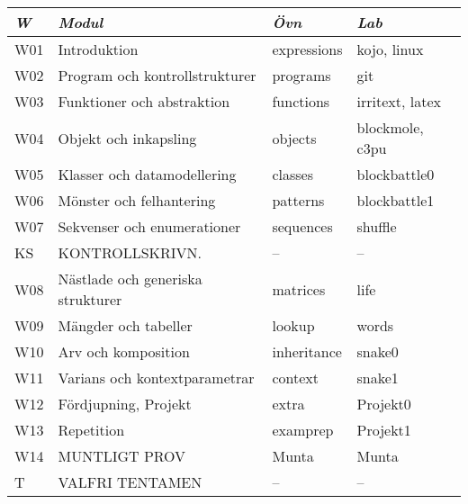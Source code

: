 \begin{tabular}{l|l|l|l}
\textit{W} & \textit{Modul} & \textit{Övn} & \textit{Lab} \\ \hline \hline
W01 & Introduktion & expressions & kojo, linux \\
W02 & Program och kontrollstrukturer & programs & git \\
W03 & Funktioner och abstraktion & functions & irritext, latex \\
W04 & Objekt och inkapsling & objects & blockmole, c3pu \\
W05 & Klasser och datamodellering & classes & blockbattle0 \\
W06 & Mönster och felhantering & patterns & blockbattle1 \\
W07 & Sekvenser och enumerationer & sequences & shuffle \\
KS & KONTROLLSKRIVN. & -- & -- \\
W08 & Nästlade och generiska strukturer & matrices & life \\
W09 & Mängder och tabeller & lookup & words \\
W10 & Arv och komposition & inheritance & snake0 \\
W11 & Varians och kontextparametrar & context & snake1 \\
W12 & Fördjupning, Projekt & extra & Projekt0 \\
W13 & Repetition & examprep & Projekt1 \\
W14 & MUNTLIGT PROV & Munta & Munta \\
T & VALFRI TENTAMEN & -- & -- \\
\end{tabular}
